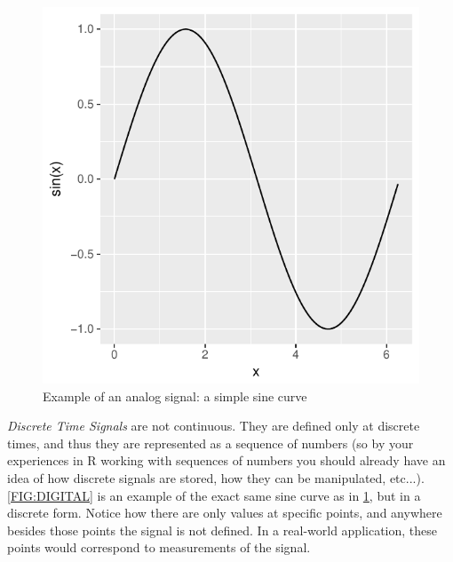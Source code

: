\documentclass[12pt,oneside]{book}\usepackage[]{graphicx}\usepackage[]{color}
\makeatletter
\def\maxwidth{ %
  \ifdim\Gin@nat@width>\linewidth
    \linewidth
  \else
    \Gin@nat@width
  \fi
}
\newenvironment{knitrout}{}{} %
\makeatother
\begin{document}
{{{{\begin{figure}[h]
\begin{center}
\begin{knitrout}
\color{fgcolor}
\includegraphics[width=\maxwidth]{figure/unnamed-chunk-303-1} 

\end{knitrout}
\caption{Example of an analog signal: a simple sine curve}
\label{FIG:ANALOGSIGNAL}
\end{center}
\end{figure}

\emph{Discrete Time Signals} are not continuous. They are defined only at discrete times, and thus they are represented as a sequence of numbers (so by your experiences in R working with sequences of numbers you should already have an idea of how discrete signals are stored, how they can be manipulated, etc...). \ref{FIG:DIGITAL} is an example of the exact same sine curve as in \ref{FIG:ANALOGSIGNAL}, but in a discrete form. Notice how there are only values at specific points, and anywhere besides those points the signal is not defined. In a real-world application, these points would correspond to measurements of the signal. 

}}}}
\end{document}
